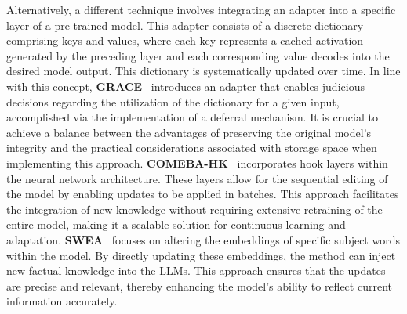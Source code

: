 \documentclass[acmsmall, screen]{acmart}
\begin{document}

Alternatively, a different technique involves integrating an adapter into a specific layer of a pre-trained model. This adapter consists of a discrete dictionary comprising keys and values, where each key represents a cached activation generated by the preceding layer and each corresponding value decodes into the desired model output. This dictionary is systematically updated over time. In line with this concept, \textbf{GRACE}~\cite{hartvigsen2022aging} introduces an adapter that enables judicious decisions regarding the utilization of the dictionary for a given input, accomplished via the implementation of a deferral mechanism. It is crucial to achieve a balance between the advantages of preserving the original model's integrity and the practical considerations associated with storage space when implementing this approach. {\textbf{COMEBA-HK}~\cite{e1} incorporates hook layers within the neural network architecture. These layers allow for the sequential editing of the model by enabling updates to be applied in batches. This approach facilitates the integration of new knowledge without requiring extensive retraining of the entire model, making it a scalable solution for continuous learning and adaptation. \textbf{SWEA}~\cite{e2} focuses on altering the embeddings of specific subject words within the model. By directly updating these embeddings, the method can inject new factual knowledge into the LLMs. This approach ensures that the updates are precise and relevant, thereby enhancing the model's ability to reflect current information accurately.}
\end{document}
